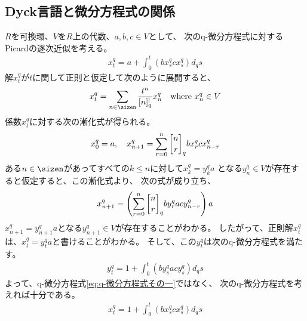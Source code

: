 {\subsection{Dyck言語と微分方程式の関係}\label{s2:Dyck言語と微分方程式の関係} %
	$R$を可換環、$V$を$R$上の代数、$a,b,c\in V$として、
	次のq-微分方程式に対するPicardの逐次近似を考える。
	\begin{equation}\label{eq:q-微分方程式その一}\begin{split}
		x^q_t = a + \int_0^t(bx^q_scx^q_s)d_qs
	\end{split}\end{equation}
	解$x^q_t$が$t$に関して正則と仮定して次のように展開すると、
	\begin{equation*}\begin{split}
		x^q_t = \sum_{n\in\sizen}\frac{t^n}{[n]_q^!} x^q_n
		\quad\text{where } x^q_n\in V
	\end{split}\end{equation*}
	係数$x^q_t$に対する次の漸化式が得られる。
	\begin{equation*}\begin{split}
		x^q_0 = a,\quad x^q_{n+1} 
		= \sum_{r=0}^n\qbinom{n}{r}_q bx^q_rcx^q_{n-r}
	\end{split}\end{equation*}
	ある$n\in\sizen$があってすべての$k\le n$に対して$x^q_k=y^q_ka$
	となる$y^q_n\in V$が存在すると仮定すると、この漸化式より、
	次の式が成り立ち、
	\begin{equation*}\begin{split}
		x^q_{n+1} = \lr{\sum_{r=0}^n\qbinom{n}{r}_q by^q_racy^q_{n-r}}a
	\end{split}\end{equation*}
	$x^q_{n+1}=y^q_{n+1}a$となる$y^q_{n+1}\in V$が存在することがわかる。
	したがって、正則解$x^q_t$は、$x^q_t=y^q_ta$と書けることがわかる。
	そして、この$y^q_t$は次のq-微分方程式を満たす。
	\begin{equation*}\begin{split}
		y^q_t = 1 + \int_0^t(by^q_sacy^q_s)d_qs
	\end{split}\end{equation*}
	よって、q-微分方程式\eqref{eq:q-微分方程式その一}ではなく、
	次のq-微分方程式を考えれば十分である。
	\begin{equation}\label{eq:q-微分方程式その二}\begin{split}
		x^q_t = 1 + \int_0^t(bx^q_scx^q_s)d_qs
	\end{split}\end{equation}
}

